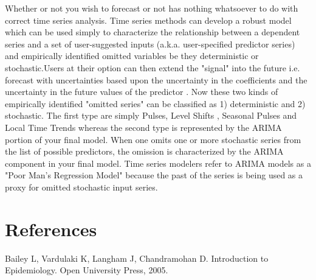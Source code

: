\documentclass{article}\usepackage[]{graphicx}\usepackage[]{color}
\begin{document}
Whether or not you wish to forecast or not has nothing whatsoever to do with correct time series analysis. Time series methods can develop a robust model which can be used simply to characterize the relationship between a dependent series and a set of user-suggested inputs (a.k.a. user-specified predictor series) and empirically identified omitted variables be they deterministic or stochastic.Users at their option can then extend the "signal" into the future i.e. forecast with uncertainties based upon the uncertainty in the coefficients and the uncertainty in the future values of the predictor . Now these two kinds of empirically identified "omitted series" can be classified as 1) deterministic and 2) stochastic. The first type are simply Pulses, Level Shifts , Seasonal Pulses and Local Time Trends whereas the second type is represented by the ARIMA portion of your final model. When one omits one or more stochastic series from the list of possible predictors, the omission is characterized by the ARIMA component in your final model. Time series modelers refer to ARIMA models as a "Poor Man's Regression Model" because the past of the series is being used as a proxy for omitted stochastic input series.

\section{References}

Bailey L, Vardulaki K, Langham J, Chandramohan D. Introduction to Epidemiology. Open University Press, 2005.
\end{document}
